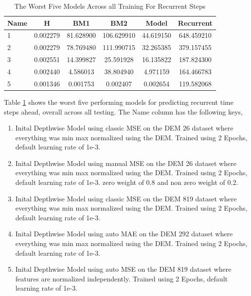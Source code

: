 \begin{table}[htbp]
	\centering
	\caption{The Worst Five Models Across all Training For Recurrent Steps}
	\label{tab:worstr}
	\begin{tabular}{p{2cm}ccccc}
		\toprule
		Name &  H &  BM1 &  BM2 &  Model &  Recurrent \\
		\midrule
		1 &       0.002279 &       81.628900 &      106.629910 &  44.619150 &          648.459210 \\
		2 &       0.002279 &       78.769480 &      111.990715 &  32.265385 &          379.157455 \\
		3 &       0.002551 &       14.399827 &       25.591928 &  16.135822 &          187.824300 \\
		4 &       0.002440 &        4.586013 &       38.804940 &   4.971159 &          164.466783 \\
		5 &       0.001346 &        0.001753 &        0.002407 &   0.002654 &          119.582068 \\
		\bottomrule
	\end{tabular}
\end{table}

Table \ref{tab:worstr} shows the worst five performing models for predicting recurrent time steps ahead, overall across all testing. The Name column has the following keys,
\begin{enumerate}
	\item Inital Depthwise Model using classic MSE on the DEM 26 dataset where everything was min max normalized using the DEM. Trained using 2 Epochs, default learning rate of 1e-3.
	\item Inital Depthwise Model using manual MSE on the DEM 26 dataset where everything was min max normalized using the DEM. Trained using 2 Epochs, default learning rate of 1e-3. zero weight of 0.8 and non zero weight of 0.2.
	\item Inital Depthwise Model using classic MSE on the DEM 819 dataset where everything was min max normalized using the DEM. Trained using 2 Epochs, default learning rate of 1e-3.
	\item Inital Depthwise Model using  auto MAE on the DEM 292 dataset where everything was min max normalized using the DEM. Trained using 2 Epochs, default learning rate of 1e-3.
	\item Inital Depthwise Model using  auto MSE on the DEM 819 dataset where features are normalized independently. Trained using 2 Epochs, default learning rate of 1e-3.
\end{enumerate}